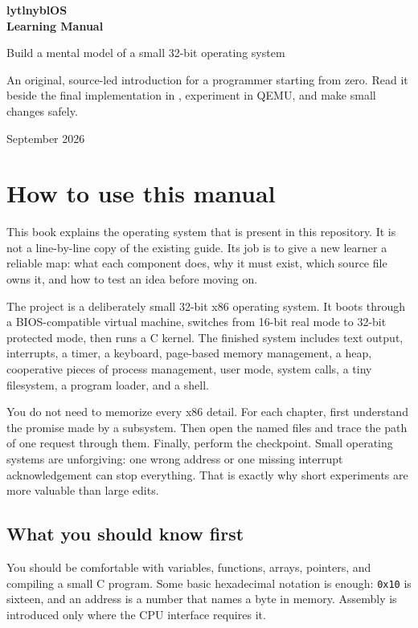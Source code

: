 \documentclass[11pt,oneside]{book}
\newcommand{\pathname}[1]{\texttt{\detokenize{#1}}}
\begin{document}
\begin{titlepage}
\centering
\vspace*{28mm}
{\Huge\bfseries lytlnyblOS\\[4mm] Learning Manual\par}
\vspace{10mm}
{\Large Build a mental model of a small 32-bit operating system\par}
\vfill
\begin{minipage}{0.8\textwidth}
\centering
An original, source-led introduction for a programmer starting from zero. Read it beside the final implementation in \pathname{lytlnybl/}, experiment in QEMU, and make small changes safely.
\end{minipage}
\vfill
{\large September 2026\par}
\end{titlepage}

\frontmatter
\chapter*{How to use this manual}
This book explains the operating system that is present in this repository. It is not a line-by-line copy of the existing guide. Its job is to give a new learner a reliable map: what each component does, why it must exist, which source file owns it, and how to test an idea before moving on.

The project is a deliberately small 32-bit x86 operating system. It boots through a BIOS-compatible virtual machine, switches from 16-bit real mode to 32-bit protected mode, then runs a C kernel. The finished system includes text output, interrupts, a timer, a keyboard, page-based memory management, a heap, cooperative pieces of process management, user mode, system calls, a tiny filesystem, a program loader, and a shell.

You do not need to memorize every x86 detail. For each chapter, first understand the promise made by a subsystem. Then open the named files and trace the path of one request through them. Finally, perform the checkpoint. Small operating systems are unforgiving: one wrong address or one missing interrupt acknowledgement can stop everything. That is exactly why short experiments are more valuable than large edits.

\section*{What you should know first}
You should be comfortable with variables, functions, arrays, pointers, and compiling a small C program. Some basic hexadecimal notation is enough: \texttt{0x10} is sixteen, and an address is a number that names a byte in memory. Assembly is introduced only where the CPU interface requires it.
\end{document}
